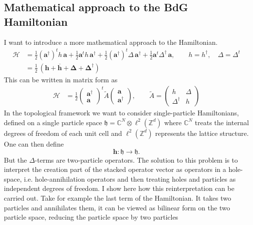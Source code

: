 \subsection*{Mathematical approach to the BdG Hamiltonian}
I want to introduce a more mathematical approach to the Hamiltonian. 
\begin{align*}
\mathcal{H} &= \frac{1}{2}(\mathbf{a}^\dagger)^t h\, \mathbf{a} + \frac{1}{2}\mathbf{a}^t h\, \mathbf{a}^\dagger
  + \frac{1}{2}(\mathbf{a}^\dagger)^t \Delta\, \mathbf{a}^\dagger + \frac{1}{2}\mathbf{a}^t \Delta^\dagger\, \mathbf{a},
\qquad h=h^\dagger,\quad \Delta=\Delta^t \\
&= \frac12\,\left( \mathbf{h} + \overline{\mathbf{h}} + \mathbf{\Delta} + \mathbf{\Delta}^\dagger \right)
\end{align*}
This can be written in matrix form as
\begin{align*}
    \mathcal{H} &= \frac{1}{2}\begin{pmatrix} \mathbf{a}^\dagger \\ \mathbf{a} \end{pmatrix}^{\!t} \tilde{A} 
\begin{pmatrix} \mathbf{a} \\ \mathbf{a}^\dagger \end{pmatrix},
\qquad
\tilde{A} = \begin{pmatrix} h & \Delta \\ \Delta^\dagger &  h \end{pmatrix} 
\end{align*}
In the topological framework we want to consider single-particle Hamiltonians, defined on a single particle space $\mathfrak{h} = \mathbb{C}^N \otimes \ell^2(\mathbb{Z}^d)$ where $\mathbb{C}^N$ treats the internal degrees of freedom of each unit cell and $\ell^2(\mathbb{Z}^d)$ represents the lattice structure. One can then define $$\mathbf{h}:\mathfrak{h} \to \mathfrak{h}.$$But the $\Delta$-terms are two-particle operators. The solution to this problem is to interpret the creation part of the stacked operator vector as operators in a hole-space, i.e. hole-annihilation operators and then treating holes and particles as independent degrees of freedom. I show here how this reinterpretation can be carried out. Take for example the last term of the Hamiltonian. It takes two particles and annihilates them, it can be viewed as bilinear form on the two particle space, reducing the particle space by two particles
